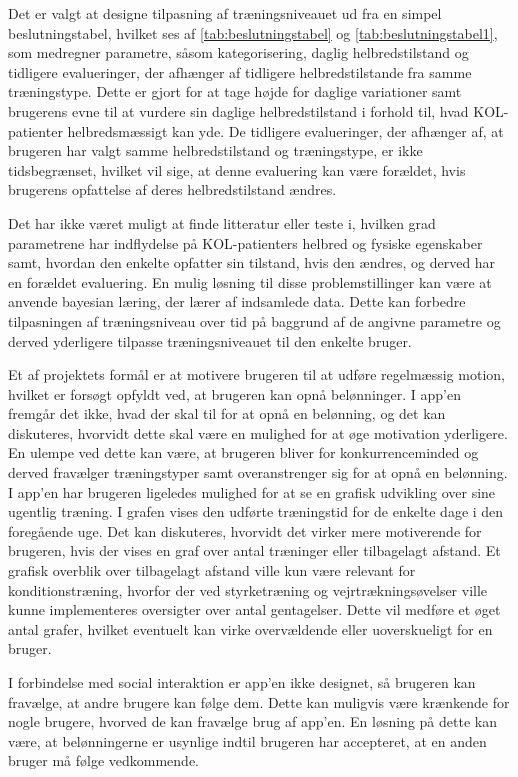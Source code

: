 Det er valgt at designe tilpasning af træningsniveauet ud fra en simpel beslutningstabel, hvilket ses af \autoref{tab:beslutningstabel} og \autoref{tab:beslutningstabel1}, som medregner parametre, såsom kategorisering, daglig helbredstilstand og tidligere evalueringer, der afhænger af tidligere helbredstilstande fra samme træningstype. Dette er gjort for at tage højde for daglige variationer samt brugerens evne til at vurdere sin daglige helbredstilstand i forhold til, hvad KOL-patienter helbredsmæssigt kan yde. De tidligere evalueringer, der afhænger af, at brugeren har valgt samme helbredstilstand og træningstype, er ikke tidsbegrænset, hvilket vil sige, at denne evaluering kan være forældet, hvis brugerens opfattelse af deres helbredstilstand ændres.

Det har ikke været muligt at finde litteratur eller teste i, hvilken grad parametrene har indflydelse på KOL-patienters helbred og fysiske egenskaber samt, hvordan den enkelte opfatter sin tilstand, hvis den ændres, og derved har en forældet evaluering. En mulig løsning til disse problemstillinger kan være at anvende bayesian læring, der lærer af indsamlede data. Dette kan forbedre tilpasningen af træningsniveau over tid på baggrund af de angivne parametre og derved yderligere tilpasse træningsniveauet til den enkelte bruger. 

Et af projektets formål er at motivere brugeren til at udføre regelmæssig motion, hvilket er forsøgt opfyldt ved, at brugeren kan opnå belønninger. I app’en fremgår det ikke, hvad der skal til for at opnå en belønning, og det kan diskuteres, hvorvidt dette skal være en mulighed for at øge motivation yderligere. En ulempe ved dette kan være, at brugeren bliver for konkurrenceminded og derved fravælger træningstyper samt overanstrenger sig for at opnå en belønning. I app'en har brugeren ligeledes mulighed for at se en grafisk udvikling over sine ugentlig træning. I grafen vises den udførte træningstid for de enkelte dage i den foregående uge. Det kan diskuteres, hvorvidt det virker mere motiverende for brugeren, hvis der vises en graf over antal træninger eller tilbagelagt afstand. Et grafisk overblik over tilbagelagt afstand ville kun være relevant for konditionstræning, hvorfor der ved styrketræning og vejrtrækningsøvelser ville kunne implementeres oversigter over antal gentagelser. Dette vil medføre et øget antal grafer, hvilket eventuelt kan virke overvældende eller uoverskueligt for en bruger.

I forbindelse med social interaktion er app’en ikke designet, så brugeren kan fravælge, at andre brugere kan følge dem. Dette kan muligvis være krænkende  for nogle brugere, hvorved de kan fravælge brug af app’en. En løsning på dette kan være, at belønningerne er usynlige indtil brugeren har accepteret, at en anden bruger må følge vedkommende.

